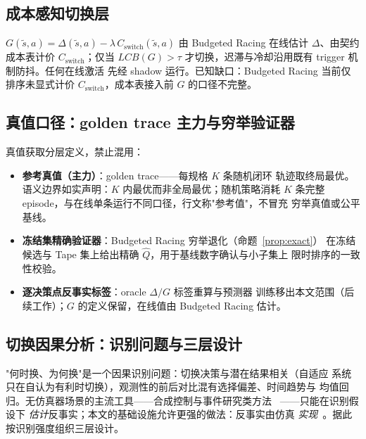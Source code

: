 \documentclass[11pt,a4paper]{article}
\newcommand{\racing}{Budgeted Racing}
\begin{document}
\subsection{成本感知切换层}

$G(\tilde{s},a) = \Delta(\tilde{s},a) - \lambda\, C_\text{switch}(\tilde{s},a)$
由 \racing{} 在线估计 $\Delta$、由契约成本表计价 $C_\text{switch}$；仅当
$LCB(G) > \tau$ 才切换，迟滞与冷却沿用既有 trigger 机制防抖。任何在线激活
先经 shadow 运行。已知缺口：\racing{} 当前仅排序未显式计价
$C_\text{switch}$，成本表接入前 $G$ 的口径不完整。

\subsection{真值口径：golden trace 主力与穷举验证器}

真值获取分层定义，禁止混用：
\begin{itemize}
    \item \textbf{参考真值（主力）}：golden trace——每规格 $K$ 条随机闭环
    轨迹取终局最优。语义边界如实声明：$K$ 内最优而非全局最优；随机策略消耗
    $K$ 条完整 episode，与在线单条运行不同口径，行文称"参考值"，不冒充
    穷举真值或公平基线。
    \item \textbf{冻结集精确验证器}：\racing{} 穷举退化（命题~\ref{prop:exact}）
    在冻结候选与 Tape 集上给出精确 $\hat{Q}$，用于基线数字确认与小子集上
    限时排序的一致性校验。
    \item \textbf{逐决策点反事实标签}：oracle $\Delta/G$ 标签重算与预测器
    训练移出本文范围（后续工作）；$G$ 的定义保留，在线值由 \racing{} 估计。
\end{itemize}

\subsection{切换因果分析：识别问题与三层设计}

"何时换、为何换"是一个因果识别问题：切换决策与潜在结果相关（自适应
系统只在自认为有利时切换），观测性的前后对比混有选择偏差、时间趋势与
均值回归。无仿真器场景的主流工具——合成控制与事件研究类方法
~\citep{bellot2021policy,chernozhukov2024causalml}——只能在识别假设下
\emph{估计}反事实；本文的基础设施允许更强的做法：反事实由仿真
\emph{实现}~\citep{laudy2026dtcf}。据此按识别强度组织三层设计。
\end{document}

